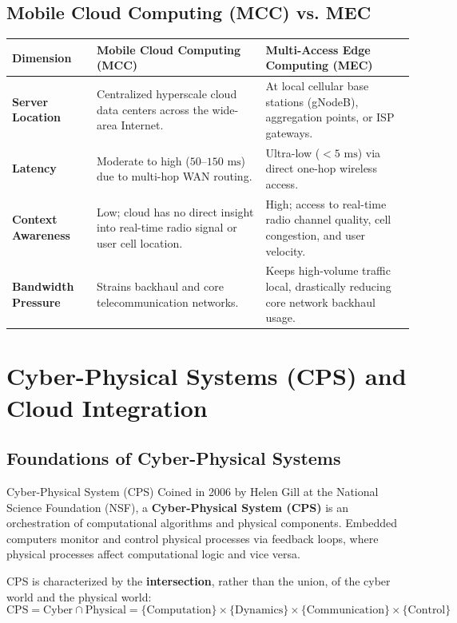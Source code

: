 \documentclass[11pt,a4paper,openany]{report}
\begin{document}
\subsection{Mobile Cloud Computing (MCC) vs. MEC}
\begin{center}
\begin{tabularx}{\textwidth}{>{\bfseries}l X X}
\toprule
Dimension & Mobile Cloud Computing (MCC) & Multi-Access Edge Computing (MEC)\\
\midrule
Server Location & Centralized hyperscale cloud data centers across the wide-area Internet. & At local cellular base stations (gNodeB), aggregation points, or ISP gateways.\\
Latency & Moderate to high ($50\text{--}150\text{ ms}$) due to multi-hop WAN routing. & Ultra-low ($< 5\text{ ms}$) via direct one-hop wireless access.\\
Context Awareness & Low; cloud has no direct insight into real-time radio signal or user cell location. & High; access to real-time radio channel quality, cell congestion, and user velocity.\\
Bandwidth Pressure & Strains backhaul and core telecommunication networks. & Keeps high-volume traffic local, drastically reducing core network backhaul usage.\\
\bottomrule
\end{tabularx}
\end{center}

\section{Cyber-Physical Systems (CPS) and Cloud Integration}
\subsection{Foundations of Cyber-Physical Systems}
\begin{defbox}{Cyber-Physical System (CPS)}
Coined in 2006 by Helen Gill at the National Science Foundation (NSF), a \textbf{Cyber-Physical System (CPS)} is an orchestration of computational algorithms and physical components. Embedded computers monitor and control physical processes via feedback loops, where physical processes affect computational logic and vice versa.
\end{defbox}

CPS is characterized by the \textbf{intersection}, rather than the union, of the cyber world and the physical world:
\begin{equation}
\text{CPS} = \text{Cyber} \cap \text{Physical} = \{\text{Computation}\} \times \{\text{Dynamics}\} \times \{\text{Communication}\} \times \{\text{Control}\}
\end{equation}
\end{document}
